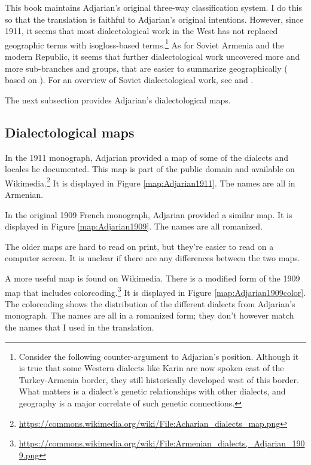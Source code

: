 This book maintains Adjarian's original three-way classification system. I do this so that the translation is faithful to Adjarian's original intentions. However, since 1911, it seems that most dialectological work in the West has not replaced geographic terms with isogloss-based terms.\footnote{Consider the following counter-argument to Adjarian's position.  Although it is true that some Western dialects like Karin are now spoken east of the Turkey-Armenia border, they still historically developed west of this border. What matters is a dialect's genetic relationships with other dialects, and geography is a major correlate of such genetic connections. } As for Soviet Armenia and the modern Republic, it seems that further dialectological work uncovered more and more sub-branches and groups, that are easier to summarize geographically (\citealt[\S 4]{Martirosyan-2019-Armeniandialects} based on \citealt{Jahukyan-1972-ArmenianDiaolectology}). For an overview of Soviet dialectological work, see \citet{Djahukian-1986-IntroductionToDialectology} and \citet{Weitenberg-2017-DialectologyArmenian}.


The next subsection provides Adjarian's dialectological maps.

\subsection{Dialectological maps}\label{section:HossepIntro:maps}


In the 1911 monograph, Adjarian provided a map of some of the dialects and locales he documented. This map is part of the public domain and available on Wikimedia.\footnote{\url{https://commons.wikimedia.org/wiki/File:Acharian_dialects_map.png}} It is displayed in Figure \ref{map:Adjarian1911}. The names are all in Armenian. 

In the original 1909 French monograph, Adjarian provided a similar map. It   is displayed in Figure \ref{map:Adjarian1909}. The names are all romanized. 


The older maps are hard to read on print, but they're easier to read on a computer screen. It is unclear if there are any differences between the two maps.

A more useful map is found on Wikimedia. There is a modified form of the 1909 map that includes colorcoding.\footnote{\url{https://commons.wikimedia.org/wiki/File:Armenian_dialects,_Adjarian_1909.png}} It   is displayed in Figure \ref{map:Adjarian1909color}. The colorcoding shows the distribution of the different dialects from Adjarian's monograph. The names are all in a romanized form; they don't however match the names that I used in the translation. 



